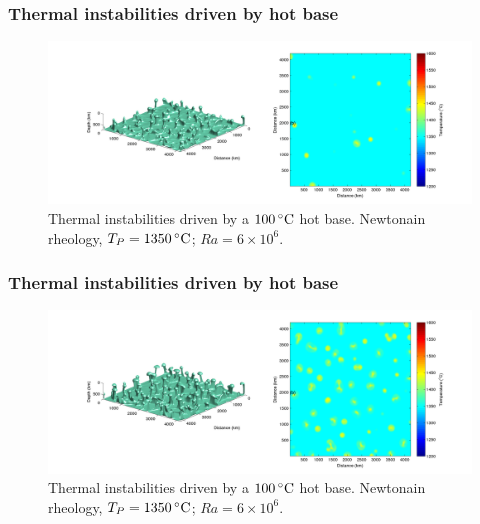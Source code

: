 \documentclass[aspectratio=169]{beamer}
\begin{document}
\begin{frame}
    \frametitle{Thermal instabilities driven by hot base}
    \begin{figure}
        \vspace{-.5cm}
        \includegraphics[width=0.85\paperwidth]{./figures/Newt100/dT1.0741_4x4_Newt_Ra6e6_2.png}
        \caption{Thermal instabilities driven by a $100\rm\,^{\circ}C$ hot base. Newtonain rheology, $T_{P}=1350\rm\,^{\circ}C$; $Ra = 6\times10^{6}$.}
    \end{figure}
\end{frame}

\begin{frame}
    \frametitle{Thermal instabilities driven by hot base}
    \begin{figure}
        \vspace{-.5cm}
        \includegraphics[width=0.85\paperwidth]{./figures/Newt100/dT1.0741_4x4_Newt_Ra6e6_3.png}
        \caption{Thermal instabilities driven by a $100\rm\,^{\circ}C$ hot base. Newtonain rheology, $T_{P}=1350\rm\,^{\circ}C$; $Ra = 6\times10^{6}$.}
    \end{figure}
\end{frame}
\end{document}
